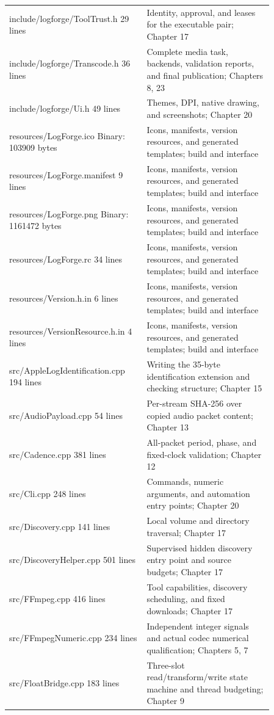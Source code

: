 \documentclass[11pt,a4paper,openany]{book}
\begin{document}
\begin{longtable}{p{0.43\linewidth}p{0.43\linewidth}}
include/logforge/ToolTrust.h
29 lines & Identity, approval, and leases for the executable pair; Chapter 17\\
include/logforge/Transcode.h
36 lines & Complete media task, backends, validation reports, and final publication; Chapters 8, 23\\
include/logforge/Ui.h
49 lines & Themes, DPI, native drawing, and screenshots; Chapter 20\\
resources/LogForge.ico
Binary: 103909 bytes & Icons, manifests, version resources, and generated templates; build and interface\\
resources/LogForge.manifest
9 lines & Icons, manifests, version resources, and generated templates; build and interface\\
resources/LogForge.png
Binary: 1161472 bytes & Icons, manifests, version resources, and generated templates; build and interface\\
resources/LogForge.rc
34 lines & Icons, manifests, version resources, and generated templates; build and interface\\
resources/Version.h.in
6 lines & Icons, manifests, version resources, and generated templates; build and interface\\
resources/VersionResource.h.in
4 lines & Icons, manifests, version resources, and generated templates; build and interface\\
src/AppleLogIdentification.cpp
194 lines & Writing the 35-byte identification extension and checking structure; Chapter 15\\
src/AudioPayload.cpp
54 lines & Per-stream SHA-256 over copied audio packet content; Chapter 13\\
src/Cadence.cpp
381 lines & All-packet period, phase, and fixed-clock validation; Chapter 12\\
src/Cli.cpp
248 lines & Commands, numeric arguments, and automation entry points; Chapter 20\\
src/Discovery.cpp
141 lines & Local volume and directory traversal; Chapter 17\\
src/DiscoveryHelper.cpp
501 lines & Supervised hidden discovery entry point and source budgets; Chapter 17\\
src/FFmpeg.cpp
416 lines & Tool capabilities, discovery scheduling, and fixed downloads; Chapter 17\\
src/FFmpegNumeric.cpp
234 lines & Independent integer signals and actual codec numerical qualification; Chapters 5, 7\\
src/FloatBridge.cpp
183 lines & Three-slot read/transform/write state machine and thread budgeting; Chapter 9\\

\end{longtable}
\end{document}
